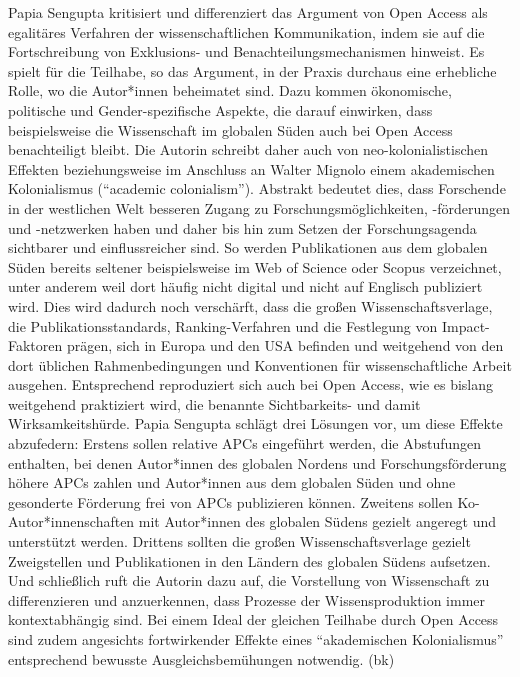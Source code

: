 \documentclass[a4paper,
fontsize=11pt,
oneside,
numbers=noperiodatend,
parskip=half-,
bibliography=totoc,
final
]{scrartcl}
\begin{document}
Papia Sengupta kritisiert und differenziert das Argument von Open Access
als egalitäres Verfahren der wissenschaftlichen Kommunikation, indem sie
auf die Fortschreibung von Exklusions- und Benachteilungsmechanismen
hinweist. Es spielt für die Teilhabe, so das Argument, in der Praxis
durchaus eine erhebliche Rolle, wo die Autor*innen beheimatet sind. Dazu
kommen ökonomische, politische und Gender-spezifische Aspekte, die
darauf einwirken, dass beispielsweise die Wissenschaft im globalen Süden
auch bei Open Access benachteiligt bleibt. Die Autorin schreibt daher
auch von neo-kolonialistischen Effekten beziehungsweise im Anschluss an
Walter Mignolo einem akademischen Kolonialismus (\enquote{academic
colonialism}). Abstrakt bedeutet dies, dass Forschende in der westlichen
Welt besseren Zugang zu Forschungsmöglichkeiten, -förderungen und
-netzwerken haben und daher bis hin zum Setzen der Forschungsagenda
sichtbarer und einflussreicher sind. So werden Publikationen aus dem
globalen Süden bereits seltener beispielsweise im Web of Science oder
Scopus verzeichnet, unter anderem weil dort häufig nicht digital und
nicht auf Englisch publiziert wird. Dies wird dadurch noch verschärft,
dass die großen Wissenschaftsverlage, die Publikationsstandards,
Ranking-Verfahren und die Festlegung von Impact-Faktoren prägen, sich in
Europa und den USA befinden und weitgehend von den dort üblichen
Rahmenbedingungen und Konventionen für wissenschaftliche Arbeit
ausgehen. Entsprechend reproduziert sich auch bei Open Access, wie es
bislang weitgehend praktiziert wird, die benannte Sichtbarkeits- und
damit Wirksamkeitshürde. Papia Sengupta schlägt drei Lösungen vor, um
diese Effekte abzufedern: Erstens sollen relative APCs eingeführt
werden, die Abstufungen enthalten, bei denen Autor*innen des globalen
Nordens und Forschungsförderung höhere APCs zahlen und Autor*innen aus
dem globalen Süden und ohne gesonderte Förderung frei von APCs
publizieren können. Zweitens sollen Ko-Autor*innenschaften mit
Autor*innen des globalen Südens gezielt angeregt und unterstützt werden.
Drittens sollten die großen Wissenschaftsverlage gezielt Zweigstellen
und Publikationen in den Ländern des globalen Südens aufsetzen. Und
schließlich ruft die Autorin dazu auf, die Vorstellung von Wissenschaft
zu differenzieren und anzuerkennen, dass Prozesse der Wissensproduktion
immer kontextabhängig sind. Bei einem Ideal der gleichen Teilhabe durch
Open Access sind zudem angesichts fortwirkender Effekte eines
\enquote{akademischen Kolonialismus} entsprechend bewusste
Ausgleichsbemühungen notwendig. (bk)
\end{document}
